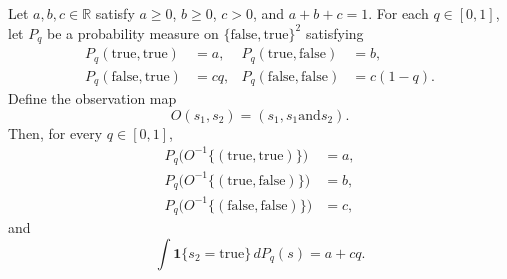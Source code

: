 \begin{theorem}
Let $a,b,c\in\mathbb R$ satisfy $a\ge0$, $b\ge0$, $c>0$, and
$a+b+c=1$.  For each $q\in[0,1]$, let $P_q$ be a probability measure on
$\{\mathrm{false},\mathrm{true}\}^2$ satisfying
\[
\begin{aligned}
 P_q(\mathrm{true},\mathrm{true})&=a,&
 P_q(\mathrm{true},\mathrm{false})&=b,\\
 P_q(\mathrm{false},\mathrm{true})&=cq,&
 P_q(\mathrm{false},\mathrm{false})&=c(1-q).
\end{aligned}
\]
Define the observation map
\[
  O(s_1,s_2)=(s_1,s_1\mathbin{\mathrm{and}}s_2).
\]
Then, for every $q\in[0,1]$,
\[
\begin{aligned}
 P_q\bigl(O^{-1}\{(\mathrm{true},\mathrm{true})\}\bigr)&=a,\\
 P_q\bigl(O^{-1}\{(\mathrm{true},\mathrm{false})\}\bigr)&=b,\\
 P_q\bigl(O^{-1}\{(\mathrm{false},\mathrm{false})\}\bigr)&=c,
\end{aligned}
\]
and
\[
  \int \mathbf 1\{s_2=\mathrm{true}\}\,dP_q(s)=a+cq.
\]
\end{theorem}
